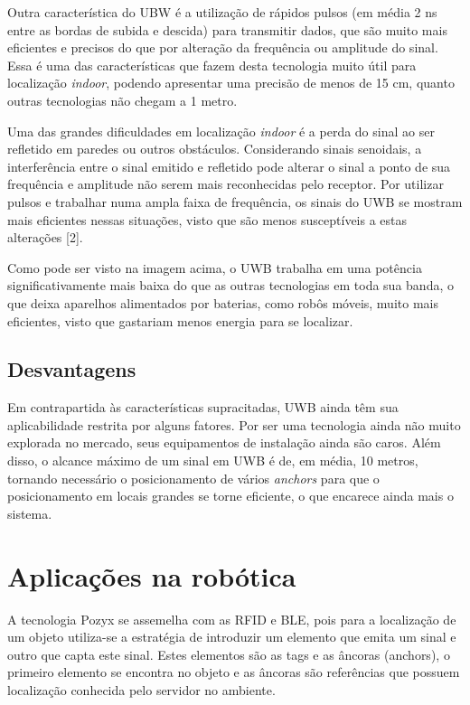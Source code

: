 Outra característica do UBW é a utilização de rápidos pulsos (em média 2 ns entre as bordas de subida e descida) para transmitir dados, 
que são muito mais eficientes e precisos do que por alteração da frequência ou amplitude do sinal. Essa é uma das características
que fazem desta tecnologia muito útil para localização \textit{indoor}, podendo apresentar uma precisão de menos de 15 cm,
quanto outras tecnologias não chegam a 1 metro.

Uma das grandes dificuldades em localização \textit{indoor} é a perda do sinal ao ser refletido em paredes ou outros obstáculos. Considerando sinais
senoidais, a interferência entre o sinal emitido e refletido pode alterar o sinal a ponto de sua frequência e amplitude não serem
mais reconhecidas pelo receptor. Por utilizar pulsos e trabalhar numa ampla faixa de frequência, os sinais do UWB se mostram mais 
eficientes nessas situações, visto que são menos susceptíveis a estas alterações [2].

Como pode ser visto na imagem acima, o UWB trabalha em uma potência significativamente mais baixa do que as outras tecnologias em 
toda sua banda, o que deixa aparelhos alimentados por baterias, como robôs móveis, muito mais eficientes, visto que gastariam menos energia
para se localizar.

\subsection{Desvantagens}
Em contrapartida às características supracitadas, UWB ainda têm sua aplicabilidade restrita por alguns fatores.
Por ser uma tecnologia ainda não muito explorada no mercado, seus equipamentos de instalação ainda são caros. Além disso,
o alcance máximo de um sinal em UWB é de, em média, 10 metros, tornando necessário o posicionamento de vários \textit{anchors} para que
o posicionamento em locais grandes se torne eficiente, o que encarece ainda mais o sistema.

\section{Aplicações na robótica}
A tecnologia Pozyx se assemelha com as RFID e BLE, pois para a localização de um objeto utiliza-se a estratégia de introduzir um elemento que emita um sinal e outro que capta este sinal. Estes elementos são as tags e as âncoras (anchors), o primeiro elemento se encontra no objeto e as âncoras são referências que possuem localização conhecida pelo servidor no ambiente. 

